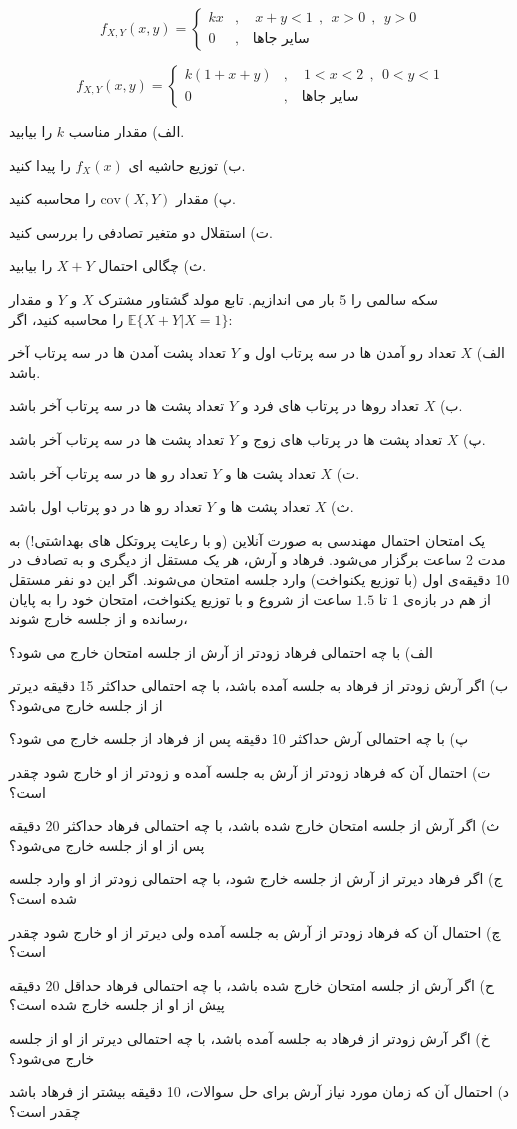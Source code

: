 $$
f_{X,Y}(x,y)=\begin{cases}
kx&,\quad x+y<1 \ \ ,\ \ x>0 \ \ , \ \ y>0\\
0&,\quad \text{سایر جاها}
\end{cases}
$$

$$
f_{X,Y}(x,y)=\begin{cases}
k(1+x+y)&,\quad 1<x<2\ \ , \ \ 0<y<1\\
0&,\quad \text{سایر جاها}
\end{cases}
$$

الف) مقدار مناسب $k$ را بیابید.

ب) توزیع حاشیه ای 
$
f_X(x)
$
را پیدا کنید.

پ) مقدار 
$
\text{cov}(X,Y)
$
را محاسبه کنید.

ت) استقلال دو متغیر تصادفی را بررسی کنید.

ث) چگالی احتمال $X+Y$ را بیابید.

\Q
سکه سالمی را 5 بار می اندازیم. تابع مولد گشتاور مشترک $X$ و $Y$ و مقدار
$\mathbb{E}\{X+Y|X=1\}$
را محاسبه کنید، اگر:

الف) $X$ تعداد رو آمدن ها در سه پرتاب اول و $Y$ تعداد پشت آمدن ها در سه پرتاب آخر باشد.

ب) $X$ تعداد روها در پرتاب های فرد و $Y$ تعداد پشت ها در سه پرتاب آخر باشد.

پ) $X$ تعداد پشت ها در پرتاب های زوج و $Y$ تعداد پشت ها در سه پرتاب آخر باشد.

ت) $X$ تعداد پشت ها و $Y$ تعداد رو ها در سه پرتاب آخر باشد.

ث) $X$ تعداد پشت ها و $Y$ تعداد رو ها در دو پرتاب اول باشد.

\Q
یک امتحان احتمال مهندسی به صورت آنلاین (و با رعایت پروتکل های بهداشتی!) به مدت 2 ساعت برگزار می‌شود. فرهاد و آرش، هر یک مستقل از دیگری و به تصادف در 10 دقیقه‌ی اول (با توزیع یکنواخت) وارد جلسه امتحان می‌شوند. اگر این دو نفر مستقل از هم در بازه‌ی 1 تا $1.5$ ساعت از شروع و با توزیع یکنواخت، امتحان خود را به پایان رسانده و از جلسه خارج شوند،

الف) با چه احتمالی فرهاد زودتر از آرش از جلسه امتحان خارج می شود؟

ب) اگر آرش زودتر از فرهاد به جلسه آمده باشد، با چه احتمالی حداکثر 15 دقیقه دیرتر از از جلسه خارج می‌شود؟

پ) با چه احتمالی آرش حداکثر 10 دقیقه پس از فرهاد از جلسه خارج می شود؟

ت) احتمال آن که فرهاد زودتر از آرش به جلسه آمده و زودتر از او خارج شود چقدر است؟

ث) اگر آرش از جلسه امتحان خارج شده باشد، با چه احتمالی فرهاد حداکثر 20 دقیقه پس از او از جلسه خارج می‌شود؟

ج) اگر فرهاد دیرتر از آرش از جلسه خارج شود، با چه احتمالی زودتر از او وارد جلسه شده است؟

چ) احتمال آن که فرهاد زودتر از آرش به جلسه آمده ولی دیرتر از او خارج شود چقدر است؟

ح) اگر آرش از جلسه امتحان خارج شده باشد، با چه احتمالی فرهاد حداقل 20 دقیقه پیش از او از جلسه خارج شده است؟

خ) اگر آرش زودتر از فرهاد به جلسه آمده باشد، با چه احتمالی دیرتر از او از جلسه خارج می‌شود؟

د) احتمال آن که زمان مورد نیاز آرش برای حل سوالات، 10 دقیقه بیشتر از فرهاد باشد چقدر است؟